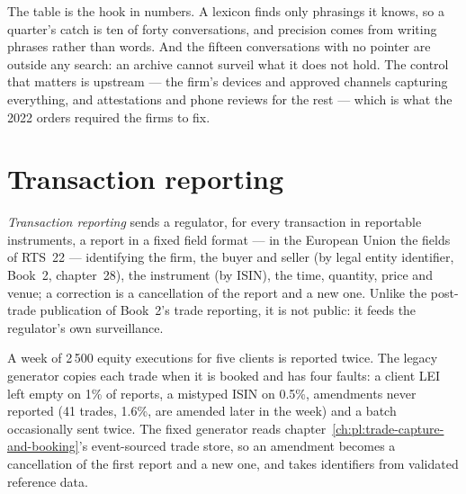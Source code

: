 The table is the hook in numbers. A lexicon finds only phrasings it knows, so a quarter's catch is ten of forty conversations, and precision
comes from writing phrases rather than words. And the fifteen conversations with no pointer are outside any search: an archive cannot surveil
what it does not hold. The control that matters is upstream --- the firm's devices and approved channels capturing everything, and attestations
and phone reviews for the rest --- which is what the 2022 orders required the firms to fix.

\section{Transaction reporting}

\begin{definition}\label{def:pl:surveillance-and-compliance-technology:reporting}
\emph{Transaction reporting} sends a regulator, for every transaction in reportable instruments, a report in a
fixed field format --- in the European Union the fields of RTS~22 --- identifying the firm, the buyer and seller (by legal entity identifier,
Book~2, chapter~28), the instrument (by ISIN), the time, quantity, price and venue; a correction is a cancellation of the report and a new one.
Unlike the post-trade publication of Book~2's trade reporting, it is not public: it feeds the regulator's own surveillance.
\end{definition}

A week of 2\,500 equity executions for five clients is reported twice. The legacy generator copies each trade when it is booked and has four
faults: a client LEI left empty on 1\% of reports, a mistyped ISIN on 0.5\%, amendments never reported (41 trades, 1.6\%, are amended later
in the week) and a batch occasionally sent twice. The fixed generator reads chapter~\ref{ch:pl:trade-capture-and-booking}'s event-sourced
trade store, so an amendment becomes a cancellation of the first report and a new one, and takes identifiers from validated reference data.

\label{lst:pl:surveillance-and-compliance-technology:reports}

\label{lst:pl:surveillance-and-compliance-technology:recon}


